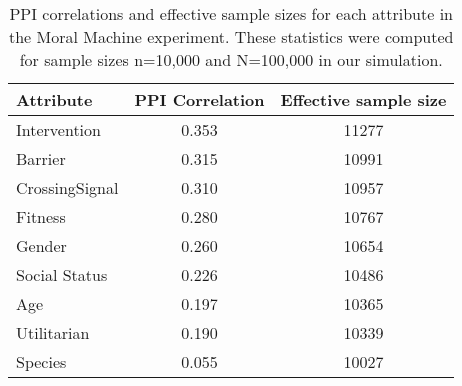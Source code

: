 \begin{table}[!h]
\centering
\caption{\label{tab:n0-mme}PPI correlations and effective sample sizes for each attribute in the Moral Machine experiment. These statistics were computed for sample sizes n=10,000 and N=100,000 in our simulation.}
\centering
\begin{tabular}[t]{l|c|c}
\hline
Attribute & PPI Correlation & Effective sample size\\
\hline
Intervention & 0.353 & 11277\\
\cline{1-3}
Barrier & 0.315 & 10991\\
\cline{1-3}
CrossingSignal & 0.310 & 10957\\
\cline{1-3}
Fitness & 0.280 & 10767\\
\cline{1-3}
Gender & 0.260 & 10654\\
\cline{1-3}
Social Status & 0.226 & 10486\\
\cline{1-3}
Age & 0.197 & 10365\\
\cline{1-3}
Utilitarian & 0.190 & 10339\\
\cline{1-3}
Species & 0.055 & 10027\\
\hline
\end{tabular}
\end{table}
